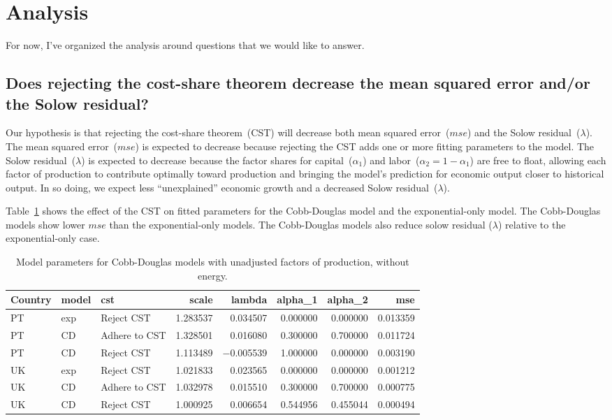 \documentclass[preprint,authoryear,12pt]{elsarticle}\usepackage[]{graphicx}\usepackage[]{color}
\begin{document}
\section{Analysis}
\label{sec:analysis}

For now, I've organized the analysis around questions that we would like to answer.


\subsection{Does rejecting the cost-share theorem 
            decrease the mean squared error and/or the Solow residual?} 
\label{sec:cst_and_solow_residual}

Our hypothesis is that rejecting the cost-share theorem~(CST) will decrease
both mean squared error~($mse$) and
the Solow residual~($\lambda$).
The mean squared error~($mse$) is expected to decrease 
because rejecting the CST adds one or more fitting parameters
to the model.
The Solow residual~($\lambda$) is expected to decrease 
because the factor shares for capital~($\alpha_1$) and labor~($\alpha_2 = 1 - \alpha_1$)
are free to float, 
allowing each factor of production 
to contribute optimally toward production and
bringing the model's prediction for economic output closer to 
historical output. 
In so doing, we expect less ``unexplained'' economic growth 
and a decreased Solow residual~($\lambda$).

Table~\ref{tab:Effect_of_CST_CD} shows the effect of the CST 
on fitted parameters for the Cobb-Douglas model and the exponential-only model.
The Cobb-Douglas models show lower $mse$ than the exponential-only models.
The Cobb-Douglas models also reduce solow residual ($\lambda$) relative
to the exponential-only case.
%
\begin{table}[ht]
\centering
\caption{Model parameters for Cobb-Douglas models with unadjusted factors of production, without energy.} 
\label{tab:Effect_of_CST_CD}
{\tiny
\begin{tabular}{lllrrrrr}
  \hline
Country & model & cst & scale & lambda & alpha\_1 & alpha\_2 & mse \\ 
  \hline
PT & exp & Reject CST & 1.283537 & 0.034507 & 0.000000 & 0.000000 & 0.013359 \\ 
  PT & CD & Adhere to CST & 1.328501 & 0.016080 & 0.300000 & 0.700000 & 0.011724 \\ 
  PT & CD & Reject CST & 1.113489 & $-$0.005539 & 1.000000 & 0.000000 & 0.003190 \\ 
  UK & exp & Reject CST & 1.021833 & 0.023565 & 0.000000 & 0.000000 & 0.001212 \\ 
  UK & CD & Adhere to CST & 1.032978 & 0.015510 & 0.300000 & 0.700000 & 0.000775 \\ 
  UK & CD & Reject CST & 1.000925 & 0.006654 & 0.544956 & 0.455044 & 0.000494 \\ 
   \hline
\end{tabular}
}
\end{table}
\end{document}

